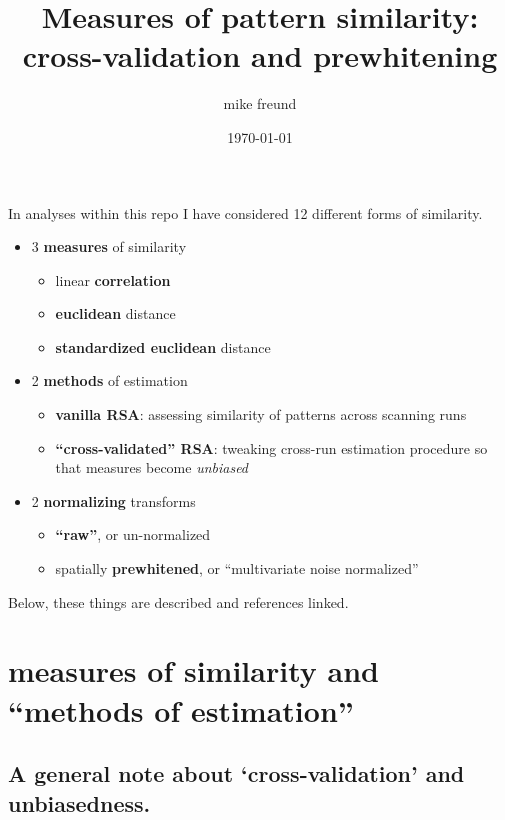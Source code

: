 \documentclass{article}\usepackage[]{graphicx}\usepackage[]{color}
\begin{document}
\title{Measures of pattern similarity: cross-validation and prewhitening}
\author{mike freund}
\date{\today}
\maketitle


In analyses within this repo I have considered 12 different forms of similarity.

\begin{itemize}

  \item 3 \textbf{measures} of similarity
  \begin{itemize}
      \item linear \textbf{correlation}
      \item \textbf{euclidean} distance
      \item  \textbf{standardized euclidean} distance
  \end{itemize}
  
  \item 2 \textbf{methods} of estimation
  \begin{itemize} 
    \item \textbf{vanilla RSA}: assessing similarity of patterns across scanning runs
    \item \textbf{``cross-validated'' RSA}: tweaking cross-run estimation procedure so that measures become \textit{unbiased}
  \end{itemize}
  
  \item 2 \textbf{normalizing} transforms
  \begin{itemize} 
    \item \textbf{``raw''}, or un-normalized
    \item spatially \textbf{prewhitened}, or ``multivariate noise normalized''
  \end{itemize}
  
\end{itemize}

Below, these things are described and references linked.


\section*{measures of similarity and ``methods of estimation''}

\subsection*{A general note about `cross-validation' and unbiasedness.}
\end{document}
